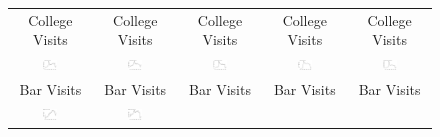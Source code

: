 \documentclass[9pt,twoside,lineno]{pnas-new}
\theoremstyle{definition}
\begin{document}
\begin{figure}[!ht]
{\begin{minipage}{\linewidth}
\begin{tabular}{c|c|c|c|c}
   College Visits  &  College Visits  & College Visits  &  College Visits  & College Visits  \\   
      \includegraphics[width=0.20\textwidth]{tables_and_figures/collegeArizonaPima}&
      \includegraphics[width=0.20\textwidth]{tables_and_figures/collegeMichiganIngham}&
      \includegraphics[width=0.20\textwidth]{tables_and_figures/collegePennsylvaniaCentre}&
      \includegraphics[width=0.20\textwidth]{tables_and_figures/collegeIowaStory}& 
      \includegraphics[width=0.20\textwidth]{tables_and_figures/collegeIllinoisChampaign}\\  
   Bar Visits  &  Bar Visits & Bar Visits  &  Bar Visits & Bar Visits     \\  
      \includegraphics[width=0.20\textwidth]{tables_and_figures/barArizonaPima}&
      \includegraphics[width=0.20\textwidth]{tables_and_figures/barMichiganIngham}&

\end{tabular}
\end{minipage}}
\end{figure}
\end{document}
